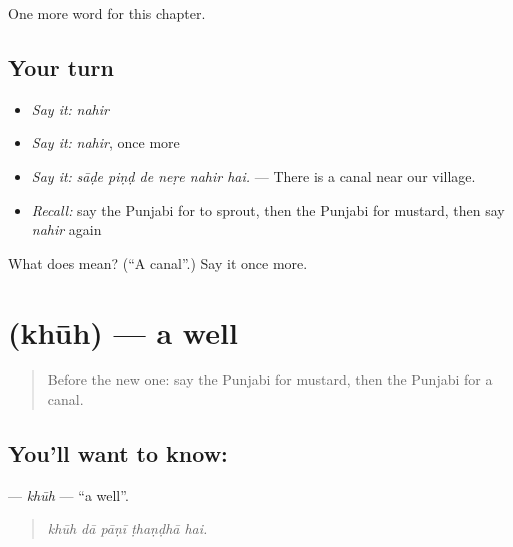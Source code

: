 \begin{grammarlens}[title={What you've built}]
One more word for this chapter.
\end{grammarlens}

\subsection*{Your turn}
\begin{itemize}
\raggedright
  \item \emph{Say it:} \emph{nahir}
  \item \emph{Say it:} \emph{nahir}, once more
  \item \emph{Say it:} \emph{sāḍe piṇḍ de neṛe nahir hai.} — There is a canal near our village.
  \item \emph{Recall:} say the Punjabi for to sprout, then the Punjabi for mustard, then say \emph{nahir} again
\end{itemize}

\begin{tcolorbox}[breakable,colback=teal!4,colframe=teal!35!black,title={Before you move on}]
What does  mean? (\textquotedblleft{}A canal\textquotedblright{}.) Say it once more.
\end{tcolorbox}
\section[\texorpdfstring{\pa{ਖੂਹ} (khūh)}{ਖੂਹ (khūh)}]{ (khūh) — a well}

\label{lesson:PA-C303-khuh}



\begin{quote}
Before the new one: say the Punjabi for mustard, then the Punjabi for a canal.
\end{quote}

\subsection*{You'll want to know: }
\textbf{} — \emph{khūh} — \textquotedblleft{}a well\textquotedblright{}.

\begin{quote}
    
\end{quote}

\begin{quote}
\emph{khūh dā pāṇī ṭhaṇḍhā hai.}
\end{quote}

